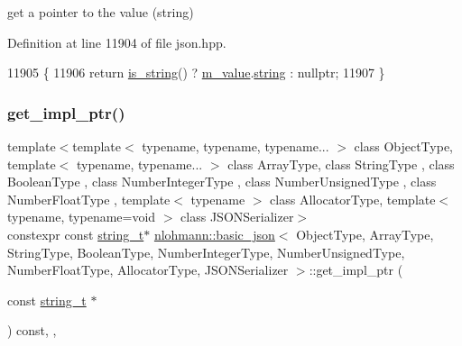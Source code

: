 get a pointer to the value (string) 



Definition at line 11904 of file json.\+hpp.


\begin{DoxyCode}
11905     \{
11906         \textcolor{keywordflow}{return} \hyperlink{classnlohmann_1_1basic__json_a69b596a4a6683b362095c9a139637396}{is\_string}() ? \hyperlink{classnlohmann_1_1basic__json_aeb0814f76966f99290cb29e127c90a77}{m\_value}.\hyperlink{unionnlohmann_1_1basic__json_1_1json__value_a9856fb4271b50d738e14c5a9a2f05118}{string} : \textcolor{keyword}{nullptr};
11907     \}
\end{DoxyCode}
\mbox{\label{classnlohmann_1_1basic__json_a0c0b516e06d10dced993934ba5139cc0}} 
\subsubsection{\texorpdfstring{get\+\_\+impl\+\_\+ptr()}{get\_impl\_ptr()}\hspace{0.1cm}{\footnotesize\ttfamily [6/14]}}
{\footnotesize\ttfamily template$<$template$<$ typename, typename, typename... $>$ class Object\+Type, template$<$ typename, typename... $>$ class Array\+Type, class String\+Type , class Boolean\+Type , class Number\+Integer\+Type , class Number\+Unsigned\+Type , class Number\+Float\+Type , template$<$ typename $>$ class Allocator\+Type, template$<$ typename, typename=void $>$ class J\+S\+O\+N\+Serializer$>$ \\
constexpr const \hyperlink{classnlohmann_1_1basic__json_a61f8566a1a85a424c7266fb531dca005}{string\+\_\+t}$\ast$ \hyperlink{classnlohmann_1_1basic__json}{nlohmann\+::basic\+\_\+json}$<$ Object\+Type, Array\+Type, String\+Type, Boolean\+Type, Number\+Integer\+Type, Number\+Unsigned\+Type, Number\+Float\+Type, Allocator\+Type, J\+S\+O\+N\+Serializer $>$\+::get\+\_\+impl\+\_\+ptr (\begin{DoxyParamCaption}\item[{const \hyperlink{classnlohmann_1_1basic__json_a61f8566a1a85a424c7266fb531dca005}{string\+\_\+t} $\ast$}]{ }\end{DoxyParamCaption}) const\hspace{0.3cm}{\ttfamily [inline]}, {\ttfamily [private]}, {\ttfamily [noexcept]}}



